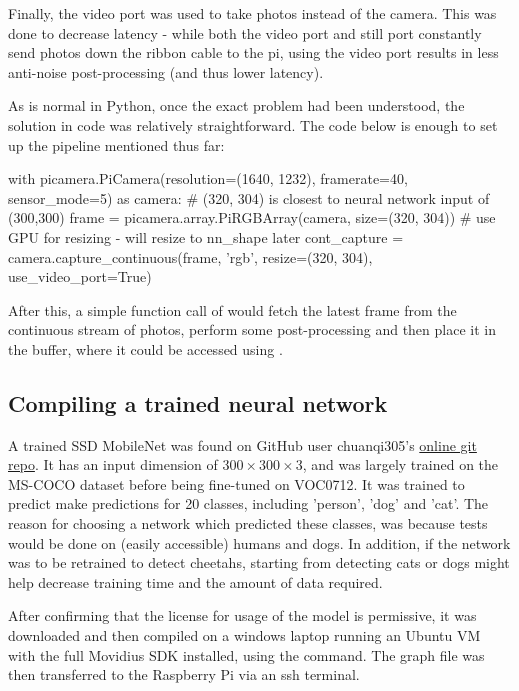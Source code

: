 Finally, the video port was used to take photos instead of the camera. This was done to decrease latency - while both the video port and still port constantly send photos down the ribbon cable to the pi, using the video port results in less anti-noise post-processing (and thus lower latency).

As is normal in Python, once the exact problem had been understood, the solution in code was relatively straightforward. The code below is enough to set up the pipeline mentioned thus far: \\

\begin{python}
with picamera.PiCamera(resolution=(1640, 1232),
                       framerate=40,
                       sensor_mode=5) as camera:
     # (320, 304) is closest to neural network input of (300,300)
    frame = picamera.array.PiRGBArray(camera,
                                      size=(320, 304))
    # use GPU for resizing - will resize to nn_shape later
    cont_capture = camera.capture_continuous(frame, 'rgb',
                                             resize=(320, 304),
                                             use_video_port=True)
\end{python}

After this, a simple function call of  would fetch the latest frame from the continuous stream of photos, perform some post-processing and then place it in the  buffer, where it could be accessed using .

\subsection{Compiling a trained neural network}
A trained SSD MobileNet was found on GitHub user chuanqi305's \href{https://github.com/chuanqi305/MobileNet-SSD}{online git repo}. It has an input dimension of $300 \times 300 \times 3$, and was largely trained on the MS-COCO dataset before being fine-tuned on VOC0712. It was trained to predict make predictions for 20 classes, including 'person', 'dog' and 'cat'. The reason for choosing a network which predicted these classes, was because tests would be done on (easily accessible) humans and dogs. In addition, if the network was to be retrained to detect cheetahs, starting from detecting cats or dogs might help decrease training time and the amount of data required.

After confirming that the license for usage of the model is permissive, it was downloaded and then compiled on a windows laptop running an Ubuntu VM with the full Movidius SDK installed, using the  command. The graph file was then transferred to the Raspberry Pi via an ssh terminal.

